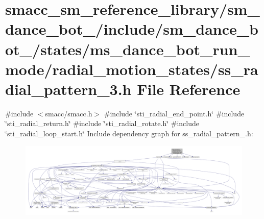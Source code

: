 \hypertarget{sm__dance__bot__2_2include_2sm__dance__bot__2_2states_2ms__dance__bot__run__mode_2radial__motion1331cbc43ee2da12f0bb7b29eef10804}{}\section{smacc\+\_\+sm\+\_\+reference\+\_\+library/sm\+\_\+dance\+\_\+bot\+\_/include/sm\+\_\+dance\+\_\+bot\+\_/states/ms\+\_\+dance\+\_\+bot\+\_\+run\+\_\+mode/radial\+\_\+motion\+\_\+states/ss\+\_\+radial\+\_\+pattern\+\_\+3.h File Reference}
\label{sm__dance__bot__2_2include_2sm__dance__bot__2_2states_2ms__dance__bot__run__mode_2radial__motion1331cbc43ee2da12f0bb7b29eef10804}
{\ttfamily \#include $<$smacc/smacc.\+h$>$}\newline
{\ttfamily \#include \char`\"{}sti\+\_\+radial\+\_\+end\+\_\+point.\+h\char`\"{}}\newline
{\ttfamily \#include \char`\"{}sti\+\_\+radial\+\_\+return.\+h\char`\"{}}\newline
{\ttfamily \#include \char`\"{}sti\+\_\+radial\+\_\+rotate.\+h\char`\"{}}\newline
{\ttfamily \#include \char`\"{}sti\+\_\+radial\+\_\+loop\+\_\+start.\+h\char`\"{}}\newline
Include dependency graph for ss\+\_\+radial\+\_\+pattern\+\_.\+h\+:
\nopagebreak
\begin{figure}[H]
\begin{center}
\leavevmode
\includegraphics[width=350pt]{sm__dance__bot__2_2include_2sm__dance__bot__2_2states_2ms__dance__bot__run__mode_2radial__motiond8d7a36a0815f92dd247489fed8df37a}
\end{center}
\end{figure}
